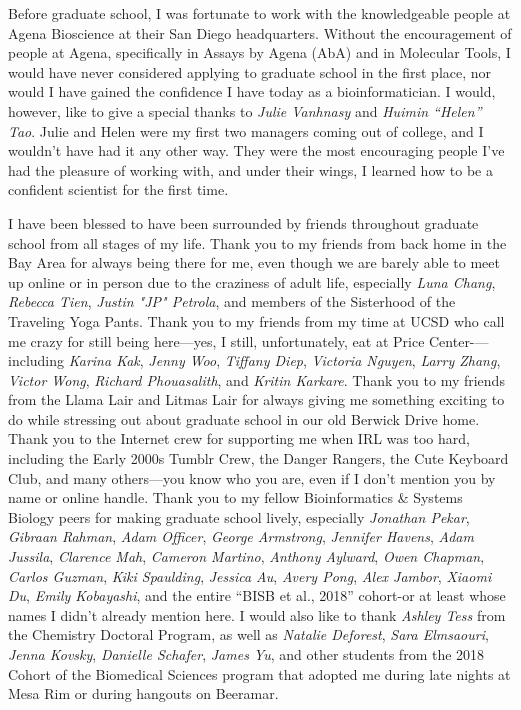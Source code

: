 \documentclass[11pt]{formatting-template}
\begin{document}
\begin{acknowledgements}
	Before graduate school, I was fortunate to work with the knowledgeable people at Agena Bioscience at their San Diego headquarters. Without the encouragement of people at Agena, specifically in Assays by Agena (AbA) and in Molecular Tools, I would have never considered applying to graduate school in the first place, nor would I have gained the confidence I have today as a bioinformatician. I would, however, like to give a special thanks to \textit{Julie Vanhnasy} and \textit{Huimin “Helen” Tao}. Julie and Helen were my first two managers coming out of college, and I wouldn’t have had it any other way. They were the most encouraging people I’ve had the pleasure of working with, and under their wings, I learned how to be a confident scientist for the first time.
	
	I have been blessed to have been surrounded by friends throughout graduate school from all stages of my life. Thank you to my friends from back home in the Bay Area for always being there for me, even though we are barely able to meet up online or in person due to the craziness of adult life, especially \textit{Luna Chang}, \textit{Rebecca Tien}, \textit{Justin "JP" Petrola}, and members of the Sisterhood of the Traveling Yoga Pants. Thank you to my friends from my time at UCSD who call me crazy for still being here—yes, I still, unfortunately, eat at Price Center-—including \textit{Karina Kak}, \textit{Jenny Woo}, \textit{Tiffany Diep}, \textit{Victoria Nguyen}, \textit{Larry Zhang}, \textit{Victor Wong}, \textit{Richard Phouasalith}, and \textit{Kritin Karkare}. Thank you to my friends from the Llama Lair and Litmas Lair for always giving me something exciting to do while stressing out about graduate school in our old Berwick Drive home. Thank you to the Internet crew for supporting me when IRL was too hard, including the Early 2000s Tumblr Crew, the Danger Rangers, the Cute Keyboard Club, and many others—you know who you are, even if I don’t mention you by name or online handle. Thank you to my fellow Bioinformatics \& Systems Biology peers for making graduate school lively, especially \textit{Jonathan Pekar}, \textit{Gibraan Rahman}, \textit{Adam Officer}, \textit{George Armstrong}, \textit{Jennifer Havens}, \textit{Adam Jussila}, \textit{Clarence Mah}, \textit{Cameron Martino}, \textit{Anthony Aylward}, \textit{Owen Chapman}, \textit{Carlos Guzman}, \textit{Kiki Spaulding}, \textit{Jessica Au}, \textit{Avery Pong}, \textit{Alex Jambor}, \textit{Xiaomi Du}, \textit{Emily Kobayashi}, and the entire “BISB et al., 2018” cohort-or at least whose names I didn't already mention here. I would also like to thank \textit{Ashley Tess} from the Chemistry Doctoral Program, as well as \textit{Natalie Deforest}, \textit{Sara Elmsaouri}, \textit{Jenna Kovsky}, \textit{Danielle Schafer}, \textit{James Yu}, and other students from the 2018 Cohort of the Biomedical Sciences program that adopted me during late nights at Mesa Rim or during hangouts on Beeramar. 
	

\end{acknowledgements}
\end{document}
